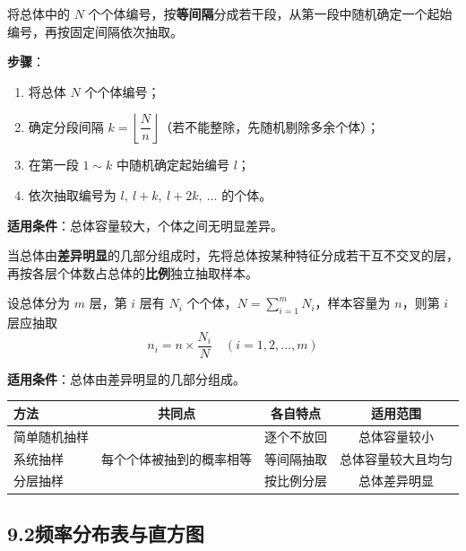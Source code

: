 \documentclass[12pt, a4paper]{ctexart}
\begin{document}
\begin{knowledgebox}
将总体中的 $N$ 个个体编号，按\textbf{等间隔}分成若干段，从第一段中随机确定一个起始编号，再按固定间隔依次抽取。

\textbf{步骤}：
\begin{enumerate}[label=(\arabic*)]
  \item 将总体 $N$ 个个体编号；
  \item 确定分段间隔 $k = \left\lfloor \dfrac{N}{n} \right\rfloor$（若不能整除，先随机剔除多余个体）；
  \item 在第一段 $1 \sim k$ 中随机确定起始编号 $l$；
  \item 依次抽取编号为 $l,\ l+k,\ l+2k,\ \ldots$ 的个体。
\end{enumerate}

\textbf{适用条件}：总体容量较大，个体之间无明显差异。
\end{knowledgebox}

\begin{knowledgebox}[分层抽样]
当总体由\textbf{差异明显}的几部分组成时，先将总体按某种特征分成若干互不交叉的层，再按各层个体数占总体的\textbf{比例}独立抽取样本。

设总体分为 $m$ 层，第 $i$ 层有 $N_i$ 个个体，$N = \sum_{i=1}^{m} N_i$，样本容量为 $n$，则第 $i$ 层应抽取
\[
n_i = n \times \frac{N_i}{N} \quad (i = 1, 2, \ldots, m)
\]

\textbf{适用条件}：总体由差异明显的几部分组成。
\end{knowledgebox}

\begin{warnbox}[三种抽样方法对比]
\begin{center}
\renewcommand{\arraystretch}{1.3}
\begin{tabular}{lccc}
\toprule
\textbf{方法} & \textbf{共同点} & \textbf{各自特点} & \textbf{适用范围} \\
\midrule
简单随机抽样 & \multirow{3}{*}{\parbox{4cm}{\centering 每个个体被抽到的概率相等}} & 逐个不放回 & 总体容量较小 \\
系统抽样 & & 等间隔抽取 & 总体容量较大且均匀 \\
分层抽样 & & 按比例分层 & 总体差异明显 \\
\bottomrule
\end{tabular}
\end{center}
\end{warnbox}

\subsection*{9.2\quad 频率分布表与直方图}
\end{document}
